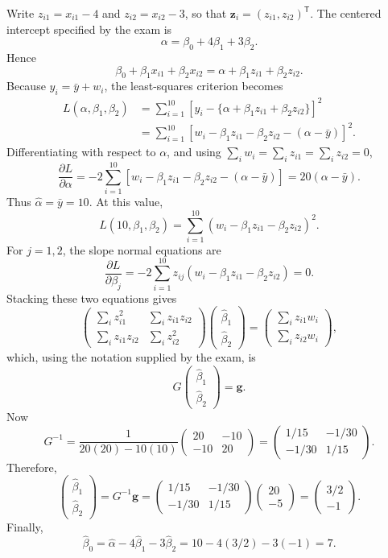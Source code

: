 \documentclass[11pt]{article}
\newcommand{\trans}{\mathsf T}
\newcommand{\answer}[1]{\boxed{\displaystyle #1}}
\begin{document}
Write \(z_{i1}=x_{i1}-4\) and \(z_{i2}=x_{i2}-3\), so that
\(\bm z_i=(z_{i1},z_{i2})^\trans\). The centered intercept specified by the
exam is
\[
  \alpha=\beta_0+4\beta_1+3\beta_2.
\]
Hence
\[
\beta_0+\beta_1x_{i1}+\beta_2x_{i2}
=\alpha+\beta_1z_{i1}+\beta_2z_{i2}.
\]
Because \(y_i=\bar y+w_i\), the least-squares criterion becomes
\begin{align*}
L(\alpha,\beta_1,\beta_2)
 &=\sum_{i=1}^{10}
 \left[y_i-\{\alpha+\beta_1z_{i1}+\beta_2z_{i2}\}\right]^2\\
 &=\sum_{i=1}^{10}
 \left[w_i-\beta_1z_{i1}-\beta_2z_{i2}-(\alpha-\bar y)\right]^2.
\end{align*}
Differentiating with respect to \(\alpha\), and using
\(\sum_iw_i=\sum_i z_{i1}=\sum_i z_{i2}=0\),
\[
 \frac{\partial L}{\partial\alpha}
 =-2\sum_{i=1}^{10}
 \left[w_i-\beta_1z_{i1}-\beta_2z_{i2}-(\alpha-\bar y)\right]
 =20(\alpha-\bar y).
\]
Thus \(\hat\alpha=\bar y=10\). At this value,
\[
 L(10,\beta_1,\beta_2)
 =\sum_{i=1}^{10}(w_i-\beta_1z_{i1}-\beta_2z_{i2})^2.
\]
For \(j=1,2\), the slope normal equations are
\[
\frac{\partial L}{\partial\beta_j}
=-2\sum_{i=1}^{10}z_{ij}
 (w_i-\beta_1z_{i1}-\beta_2z_{i2})=0.
\]
Stacking these two equations gives
\[
\begin{pmatrix}
\sum_i z_{i1}^2&\sum_i z_{i1}z_{i2}\\
\sum_i z_{i1}z_{i2}&\sum_i z_{i2}^2
\end{pmatrix}
\begin{pmatrix}\hat\beta_1\\\hat\beta_2\end{pmatrix}
=
\begin{pmatrix}\sum_i z_{i1}w_i\\\sum_i z_{i2}w_i\end{pmatrix},
\]
which, using the notation supplied by the exam, is
\[
  \answer{G
  \begin{pmatrix}\hat\beta_1\\\hat\beta_2\end{pmatrix}=\bm g}.
\]
Now
\[
G^{-1}
=\frac{1}{20(20)-10(10)}
  \begin{pmatrix}20&-10\\-10&20\end{pmatrix}
=\begin{pmatrix}
1/15&-1/30\\
-1/30&1/15
\end{pmatrix}.
\]
Therefore,
\[
\begin{pmatrix}\hat\beta_1\\\hat\beta_2\end{pmatrix}
=G^{-1}\bm g
=\begin{pmatrix}
1/15&-1/30\\
-1/30&1/15
\end{pmatrix}
\begin{pmatrix}20\\-5\end{pmatrix}
=\begin{pmatrix}3/2\\-1\end{pmatrix}.
\]
Finally,
\[
\hat\beta_0
=\hat\alpha-4\hat\beta_1-3\hat\beta_2
=10-4(3/2)-3(-1)=7.
\]
\end{document}
